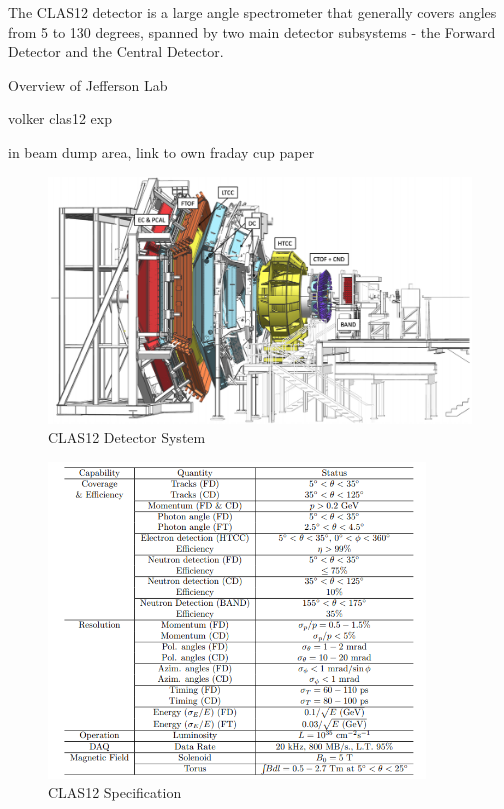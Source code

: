    The CLAS12 detector is a large angle spectrometer that generally covers angles from 5 to 130 degrees, spanned by two main detector subsystems - the Forward Detector and the Central Detector.

    Overview of Jefferson Lab

    volker clas12 exp \cite{Burkert2020TheLaboratory}


    in beam dump area, link to own fraday cup paper \cite{Johnston2019RealizationElectrons}
    \begin{figure}[H]
        \centering
        \includegraphics[width=12cm]{Chapters/Ch2-Experiment/clas-12-system/pics/other/CLA12.PNG}
        \caption{ CLAS12 Detector System }
    \end{figure}
    
    \begin{figure}[H]
        \centering
        \includegraphics[width=10cm]{Chapters/Ch2-Experiment/clas-12-system/pics/other/clas12-params.PNG}
        \caption{CLAS12 Specification}
    \end{figure}

